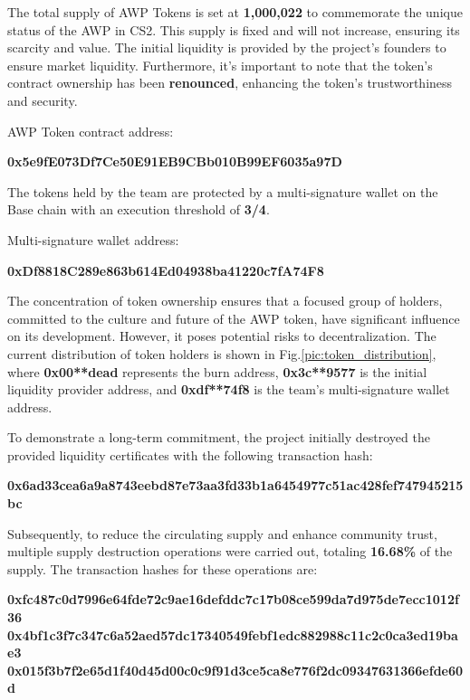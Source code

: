 \documentclass[journal,onecolumn,]{IEEEtran}
\begin{document}
The total supply of AWP Tokens is set at \textbf{1,000,022} to commemorate the unique status of the AWP in CS2. This supply is fixed and will not increase, ensuring its scarcity and value. The initial liquidity is provided by the project's founders to ensure market liquidity. Furthermore, it's important to note that the token's contract ownership has been \textbf{renounced}, enhancing the token's trustworthiness and security.

AWP Token contract address:
\begin{center}
	\textbf{0x5e9fE073Df7Ce50E91EB9CBb010B99EF6035a97D}
\end{center}

The tokens held by the team are protected by a multi-signature wallet on the Base chain with an execution threshold of \textbf{3/4}.

Multi-signature wallet address:
\begin{center}
	\textbf{0xDf8818C289e863b614Ed04938ba41220c7fA74F8}
\end{center}

The concentration of token ownership ensures that a focused group of holders, committed to the culture and future of the AWP token, have significant influence on its development. However, it poses potential risks to decentralization. The current distribution of token holders is shown in Fig.\ref{pic:token_distribution}, where \textbf{0x00**dead} represents the burn address, \textbf{0x3c**9577} is the initial liquidity provider address, and \textbf{0xdf**74f8} is the team's multi-signature wallet address.

To demonstrate a long-term commitment, the project initially destroyed the provided liquidity certificates with the following transaction hash:
\begin{center}
	\textbf{0x6ad33cea6a9a8743eebd87e73aa3fd33b1a6454977c51ac428fef747945215bc}
\end{center}

Subsequently, to reduce the circulating supply and enhance community trust, multiple supply destruction operations were carried out, totaling \textbf{16.68\%} of the supply. The transaction hashes for these operations are:
\begin{center}
	\textbf{0xfc487c0d7996e64fde72c9ae16defddc7c17b08ce599da7d975de7ecc1012f36}
	\textbf{0x4bf1c3f7c347c6a52aed57dc17340549febf1edc882988c11c2c0ca3ed19bae3}
	\textbf{0x015f3b7f2e65d1f40d45d00c0c9f91d3ce5ca8e776f2dc09347631366efde60d}
\end{center}
\end{document}
